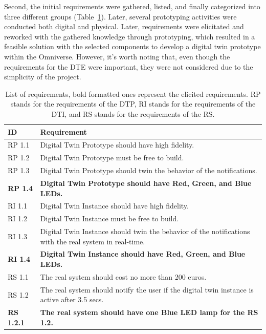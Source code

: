 \documentclass[conference]{IEEEtran}
\begin{document}
    Second, the initial requirements were gathered, listed, and finally categorized into three different groups (Table~\ref{tab:Requirements}).  Later, several prototyping activities were conducted both digital and physical. 
    Later, requirements were elicitated and reworked with the gathered knowledge through prototyping, which resulted in a feasible solution with the selected components to develop a digital twin 
    prototype within the Omniverse. However, it's worth noting that, 
    even though the requirements for the DTE were important, they were not considered due to the simplicity of the project. 

    \begin{table}[htbp]
        \centering
        \caption{List of requirements, bold formatted ones represent the elicited requirements. RP stands for the requirements of the DTP, RI stands for the requirements of the DTI, and RS stands for the requirements of the RS.}
        \label{tab:Requirements}
        \begin{tabular}{p{1cm} p{5.7cm}}
            \textbf{ID} & \textbf{Requirement} \\
            \hline
            RP 1.1 & Digital Twin Prototype should have high fidelity. \\
            RP 1.2 & Digital Twin Prototype must be free to build. \\
            RP 1.3 & Digital Twin Prototype should twin the behavior of the notifications.\\
            \textbf{RP 1.4} & \textbf{Digital Twin Prototype should have Red, Green, and Blue LEDs.}\\
            RI 1.1 & Digital Twin Instance should have high fidelity.\\
            RI 1.2 & Digital Twin Instance must be free to build.\\
            RI 1.3 & Digital Twin Instance should twin the behavior of the notifications with the real system in real-time.\\
            \textbf{RI 1.4} & \textbf{Digital Twin Instance should have Red, Green, and Blue LEDs.}\\
            RS 1.1 &  The real system should cost no more than 200 euros. \\
            RS 1.2 & The real system should notify the user if the digital twin instance is active after 3.5 secs. \\
            \textbf{RS 1.2.1} & \textbf{The real system should have one Blue LED lamp for the RS 1.2.} \\

\end{tabular}
\end{table}
\end{document}

